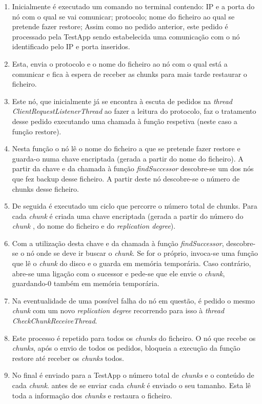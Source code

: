 \documentclass[11pt,oneside]{book}
\begin{document}
\begin{enumerate}
    \item Inicialmente é executado um comando no terminal contendo: IP e a porta do nó com o qual 
    se vai comunicar; protocolo; nome do ficheiro ao qual se pretende fazer restore; Assim como 
    no pedido anterior, este pedido é processado pela TestApp sendo estabelecida uma 
    comunicação com o nó identificado pelo IP e porta inseridos.

    \item Esta, envia o protocolo e o nome do ficheiro ao nó com o qual está a comunicar e fica 
    à espera de receber as chunks para mais tarde restaurar o ficheiro.

    \item Este nó, que inicialmente já se encontra à escuta de pedidos na \textit{thread 
    ClientRequestListenerThread} ao fazer a leitura do protocolo, faz o tratamento desse 
    pedido executando uma chamada à função respetiva (neste caso a função restore).

    \item Nesta função o nó lê o nome do ficheiro a que se pretende fazer restore e guarda-o 
    numa chave encriptada (gerada a partir do nome do ficheiro). A partir da chave e da chamada 
    à função \textit{findSuccessor} descobre-se um dos nós que fez backup desse ficheiro. 
    A partir deste nó descobre-se o número de chunks desse ficheiro. 

    \item De seguida é executado um ciclo que percorre o número total de chunks. Para cada 
    \textit{chunk} é criada uma chave encriptada (gerada a partir do número do \textit{chunk}
     , do nome do ficheiro e do \textit{replication degree}). 
     
    \item Com a utilização desta chave e da chamada à função \textit{findSuccessor}, descobre-se 
    o nó onde se deve ir buscar o \textit{chunk}. Se for o próprio, invoca-se uma função que lê 
    o \textit{chunk} do disco e o guarda em memória temporária. Caso contrário, abre-se uma 
    ligação com o sucessor e pede-se que ele envie o \textit{chunk}, guardando-0 também em memória
    temporária.

    \item Na eventualidade de uma possível falha do nó em questão, é pedido o mesmo \textit{chunk}
    com um novo \textit{replication degree} recorrendo para isso à \textit{thread CheckChunkReceiveThread}.

    \item Este processo é repetido para todos os \textit{chunks} do ficheiro. O nó que recebe os
    \textit{chunks}, após o envio de todos os pedidos, bloqueia a execução da função restore até
    receber os \textit{chunks} todos.

    \item No final é enviado para a TestApp o número total de \textit{chunks} e o conteúdo de
    cada \textit{chunk}. antes de se enviar cada \textit{chunk} é enviado o seu tamanho. 
    Esta lê toda a informação dos \textit{chunks} e restaura o ficheiro.
\end{enumerate}
 
\end{document}
